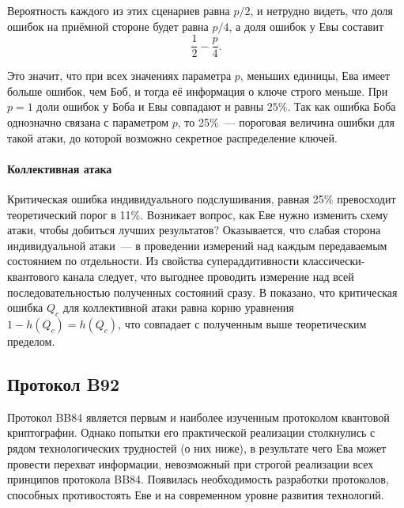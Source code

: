 Вероятность каждого из этих сценариев равна $p/2$, и нетрудно видеть, что доля ошибок на приёмной стороне будет равна $p/4$, а доля ошибок у Евы составит \begin{equation}\frac{1}{2} - \frac{p}{4}.\end{equation}

Это значит, что при всех значениях параметра $p$, меньших единицы, Ева имеет больше ошибок, чем Боб, и тогда её информация о ключе строго меньше. При $p=1$ доли ошибок у Боба и Евы совпадают и равны $25\%$. Так как ошибка Боба однозначно связана с параметром $p$, то 25\%~--- пороговая величина ошибки для такой атаки, до которой возможно секретное распределение ключей.

\paragraph{Коллективная атака}
Критическая ошибка индивидуального подслушивания, равная 25\% превосходит теоретический порог в 11\%. Возникает вопрос, как Еве нужно изменить схему атаки, чтобы добиться лучших результатов? Оказывается, что слабая сторона индивидуальной атаки~--- в проведении измерений над каждым передаваемым состоянием по отдельности. Из свойства супераддитивности  классически-квантового канала\cite{holevo} следует, что выгоднее проводить измерение над всей последовательностью полученных состояний сразу. В \cite{bb84_collective_attack} показано, что критическая ошибка $Q_c$ для коллективной атаки равна корню уравнения $1 - h(Q_c) = h(Q_c)$, что совпадает с полученным выше теоретическим пределом.

\begin{comment}
\paragraph{Атака с измерениями с тремя исходами} 
Наибольший интерес (в частности для релятивистской квантовой криптографии) представляет собой атака, в которой используются рассмотренные выше измерения с тремя исходами. Суть ее состоит в следующем.
Ева перехватывает каждую отдельную посылку от Алисы к Бобу и проводит над ней измерение с тремя исходами.
Если она получила определенный результат, то она точно знает, какое состояние посылала Алиса, и может приготовить такое же для отправки его дальше Бобу. Если же был получен неопределенный результат, то Еве остается только угадать правильное состояние
\end{comment}
\subsection{Протокол B92}
Протокол BB84 является первым и наиболее изученным протоколом квантовой криптографии. Однако попытки его практической реализации столкнулись с рядом технологических трудностей (о них ниже), в результате чего Ева может провести перехват информации, невозможный при строгой реализации всех принципов протокола BB84. Появилась необходимость разработки протоколов, способных противостоять Еве и на современном уровне развития технологий.

